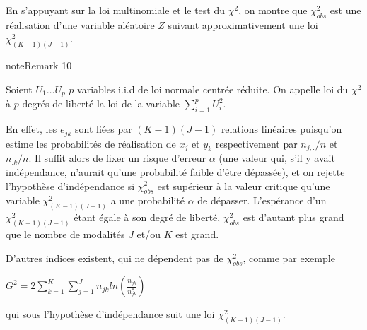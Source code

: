 \documentclass[letterpaper,10pt,french]{sphinxmanual}
\begin{document}
\sphinxAtStartPar
En s’appuyant sur la loi multinomiale et le test du \(\chi^2\), on montre que \(\chi^2_{obs}\) est une réalisation d’une variable aléatoire \(Z\) suivant approximativement une loi \(\chi^2_{(K-1)(J-1)}\).
\label{statsdescriptives:remark-21}
\begin{sphinxadmonition}{note}{Remark 10}



\sphinxAtStartPar
Soient \(U_1\ldots U_p\) \(p\) variables i.i.d de loi normale centrée réduite. On appelle loi du \(\chi^2\) à \(p\) degrés de liberté la loi de la variable \(\displaystyle\sum_{i=1}^pU_i^2\).
\end{sphinxadmonition}

\sphinxAtStartPar
En effet, les \(e_{jk}\) sont liées par \((K-1)(J-1)\) relations linéaires puisqu’on estime les probabilités de réalisation de \(x_j\) et \(y_k\) respectivement par \(n_{j,.}/n\) et \(n_{.k}/n\). Il suffit alors de fixer un risque d’erreur \(\alpha\) (une valeur qui, s’il y avait indépendance, n’aurait qu’une probabilité faible d’être dépassée), et on rejette l’hypothèse d’indépendance si \(\chi^2_{obs}\)  est supérieur à la valeur critique qu’une variable \(\chi^2_{(K-1)(J-1)}\) a une probabilité \(\alpha\) de dépasser.
L’espérance d’un \(\chi^2_{(K-1)(J-1)}\) étant égale à son degré de liberté, \(\chi^2_{obs}\) est d’autant plus grand que le nombre de modalités \(J\) et/ou \(K\) est grand.

\sphinxAtStartPar
D’autres indices existent, qui ne dépendent pas de \(\chi^2_{obs}\), comme par exemple

\sphinxAtStartPar
\(\begin{equation} G^2 = 2\displaystyle\sum_{k=1}^K\displaystyle\sum_{j=1}^J n_{jk} ln \left (\frac{ n_{jk}}{ n^*_{jk}} \right )\end{equation}\)

\sphinxAtStartPar
qui sous l’hypothèse d’indépendance suit une loi \(\chi^2_{(K-1)(J-1)}\).
\end{document}
